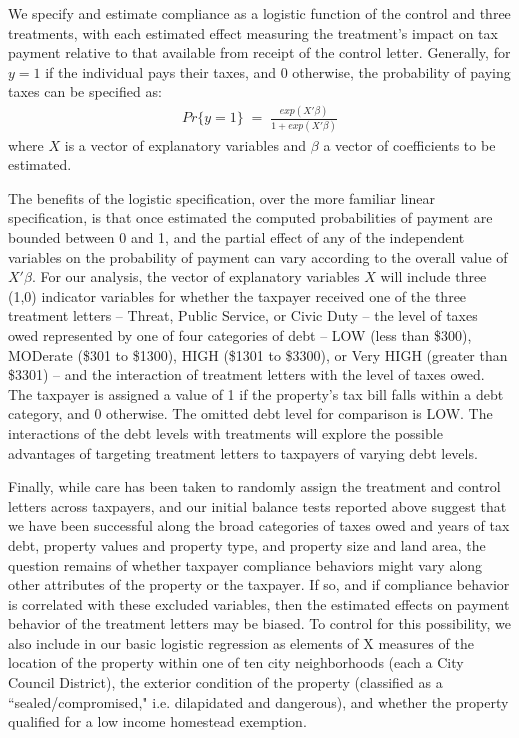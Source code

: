 \documentclass[12pt,titlepage]{article}
\begin{document}
We specify and estimate compliance
as a logistic function of the control and three treatments, with each
estimated effect measuring the treatment's impact on tax payment
relative to that available from receipt of the control letter.
Generally, for $y = 1$ if the individual pays their taxes, and 0
otherwise, the probability of paying taxes can be specified as:
\begin{eqnarray*}
Pr \{ y=1 \} \; = \; \frac{exp(X' \beta)}{1 + exp(X' \beta)}
\end{eqnarray*}
where $X$ is a vector of explanatory variables and $\beta$ a vector of
coefficients to be estimated.

The benefits of the logistic specification, over the more familiar
linear specification, is that once estimated the computed
probabilities of payment are bounded between 0 and 1, and the partial
effect of any of the independent variables on the probability of
payment can vary according to the overall value of $X'\beta$.  For our
analysis, the vector of explanatory variables $X$ will include three
(1,0) indicator variables for whether the taxpayer received one of the 
three treatment letters – Threat, Public Service, or Civic Duty – the 
level of taxes owed represented by one of four categories of debt – LOW 
(less than \$300), MODerate (\$301 to \$1300), HIGH (\$1301 to \$3300), 
or Very HIGH (greater than \$3301) – and the interaction of treatment 
letters with the level of taxes owed.  The taxpayer is assigned a 
value of 1 if the property’s tax bill falls within a debt category, 
and 0 otherwise.  The omitted debt level for comparison is LOW.  
The interactions of the debt levels with treatments will explore 
the possible advantages of targeting treatment letters to taxpayers of varying debt levels.   

Finally, while care has been taken to randomly assign the treatment
and control letters across taxpayers, and our initial balance tests
reported above suggest that we have been successful along the broad
categories of taxes owed and years of tax debt, property values and
property type, and property size and land area, the question remains
of whether taxpayer compliance behaviors might vary along other
attributes of the property or the taxpayer.  If so, and if compliance
behavior is correlated with these excluded variables, then the
estimated effects on payment behavior of the treatment letters may be
biased.  To control for this possibility, we also include in our basic
logistic regression as elements of X measures of the location of the
property within one of ten city neighborhoods (each a City Council
District), the exterior condition of the property (classified as a
``sealed/compromised," i.e. dilapidated and dangerous), and whether
the property qualified for a low income homestead exemption.  
\end{document}
